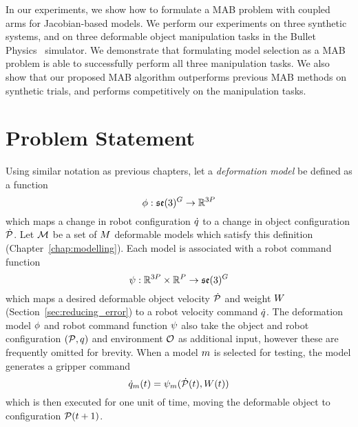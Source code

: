 In our experiments, we show how to formulate a MAB problem with coupled arms for Jacobian-based models. We perform our experiments on three synthetic systems, and on three deformable object manipulation tasks in the Bullet Physics~\cite{Coumans2010} simulator. We demonstrate that formulating model selection as a MAB problem is able to successfully perform all three manipulation tasks. We also show that our proposed MAB algorithm outperforms previous MAB methods on synthetic trials, and performs competitively on the manipulation tasks.


\section{Problem Statement}

Using similar notation as previous chapters, let a \textit{deformation model} be defined as a function 
\begin{equation}
    \phi : \mathfrak{se}(3)^G \rightarrow \mathbb{R}^{3P}
\end{equation}
which maps a change in robot configuration $\dot{q}$ to a change in object configuration $\dot{\mathcal{P}}$. Let $\mathcal{M}$ be a set of $M$ deformable models which satisfy this definition (Chapter~\ref{chap:modelling}). Each model is associated with a robot command function
\begin{equation}
    \psi : \mathbb{R}^{3P} \times \mathbb{R}^P \rightarrow \mathfrak{se}(3)^G
\end{equation}
which maps a desired deformable object velocity $\dot{\mathcal{P}}$ and weight $W$ (Section~\ref{sec:reducing_error}) to a robot velocity command $\dot{q}$. The deformation model $\phi$ and robot command function $\psi$ also take the object and robot configuration $(\mathcal{P}, q)$ and environment $\mathcal{O}$ as additional input, however these are frequently omitted for brevity. When a model $m$ is selected for testing, the model generates a gripper command
\begin{equation}
    \dot{q}_{m}(t) = \psi_m(\dot{\mathcal{P}}(t), W(t))
    \label{eqn:grippervel}
\end{equation}
which is then executed for one unit of time, moving the deformable object to configuration $\mathcal{P}(t+1)$.

